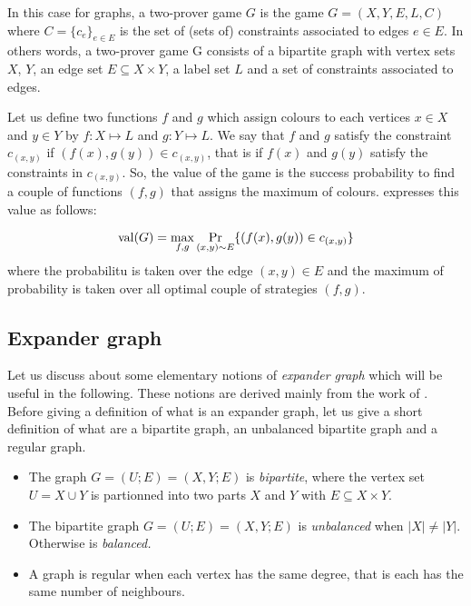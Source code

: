In this case for graphs, a two-prover game $G$ is the game $G=(X,Y,E,L,C)$ where $C=\{c_e\}_{e\in E}$ is the set of (sets of) constraints associated to edges $e \in E$.
In others words, a two-prover game G consists of a bipartite graph with vertex
sets $X$, $Y$, an edge set $ E \subseteq X \times Y$, a label set $L$ and a set of constraints associated to edges.


 Let us define two functions $f$ and $g$ which assign colours to each vertices  $x \in X$ and $y \in Y$ by $f: X\longmapsto L$ and $g: Y\longmapsto L$. We say that $f$ and $g$ satisfy the constraint $c_{(x,y)}$ if $(f(x),g(y)) \in c_{(x,y)}$, that is if $f(x)$ and $g(y)$ satisfy the constraints in $c_{(x,y)}$. So, the value of the game is the success probability to find a couple of functions $(f,g)$ that assigns the maximum of colours.    \cite{tamaki2015parallel} expresses this value as follows:
 
 $$\mathrm{val} (G)=\max_{f,g}\underset{(x,y)\sim E}\Pr  \{(f(x),g(y)) \in c_{(x,y)} \}$$
where the probabilitu is taken over the edge $(x,y) \in E$ and the maximum of probability is taken over all optimal couple of strategies $(f,g).$

\subsection{Expander graph}

 Let us discuss about some elementary notions of \textit{expander graph}  which will be useful in the following. These notions are derived mainly from the work of  \cite{raz2012strong}. Before giving a definition of what is an expander graph, let us give a short definition of what are a bipartite graph, an unbalanced bipartite graph and a regular graph.
 
\begin{itemize}
\item  The graph $G=(U;E)=(X,Y;E)$ is \emph{bipartite}, where the vertex set $U=X \cup Y$ is partionned into two parts $X$ and $Y$ with $ E\subseteq X\times Y$.
\item The bipartite graph $G=(U;E)=(X,Y;E)$ is \emph{unbalanced} when $|X| \neq |Y|$. Otherwise is \emph{balanced.}
\item A graph is regular when each vertex has the same degree, that is each has the same number of neighbours.
\end{itemize}
 
